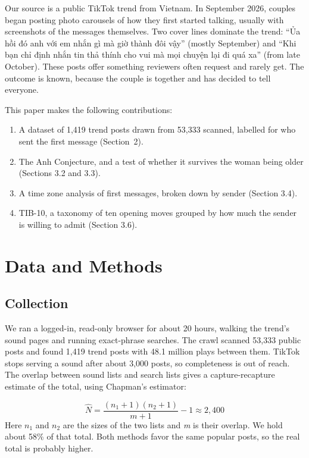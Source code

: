 \documentclass[10pt,letterpaper]{article}
\begin{document}
Our source is a public TikTok trend from Vietnam. In September 2026, couples began posting photo carousels of how they first started talking, usually with screenshots of the messages themselves. Two cover lines dominate the trend: ``Ủa hồi đó anh với em nhắn gì mà giờ thành đôi vậy'' (mostly September) and ``Khi bạn chỉ định nhắn tin thả thính cho vui mà mọi chuyện lại đi quá xa'' (from late October). These posts offer something reviewers often request and rarely get. The outcome is known, because the couple is together and has decided to tell everyone.

This paper makes the following contributions:

\begin{enumerate}[leftmargin=2em,itemsep=2pt,topsep=2pt,parsep=0pt]\item A dataset of 1,419 trend posts drawn from 53,333 scanned, labelled for who sent the first message (Section~2).\item The Anh Conjecture, and a test of whether it survives the woman being older (Sections 3.2 and 3.3).\item A time zone analysis of first messages, broken down by sender (Section 3.4).\item TIB-10, a taxonomy of ten opening moves grouped by how much the sender is willing to admit (Section 3.6).\end{enumerate}
\section{Data and Methods}
\subsection{Collection}
We ran a logged-in, read-only browser for about 20 hours, walking the trend's sound pages and running exact-phrase searches. The crawl scanned 53,333 public posts and found 1,419 trend posts with 48.1 million plays between them. TikTok stops serving a sound after about 3,000 posts, so completeness is out of reach. The overlap between sound lists and search lists gives a capture-recapture estimate of the total, using Chapman's estimator:

\begin{equation}\hat{N}=\frac{(n_1+1)(n_2+1)}{m+1}-1\approx 2{,}400\end{equation}
Here $n_1$ and $n_2$ are the sizes of the two lists and \emph{m} is their overlap. We hold about 58\% of that total. Both methods favor the same popular posts, so the real total is probably higher.
\end{document}
